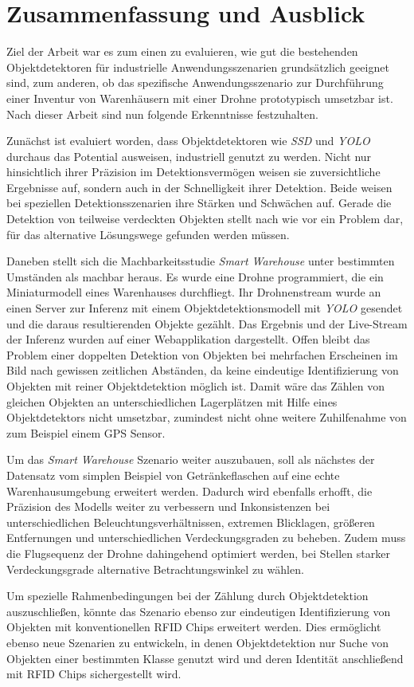 \chapter{Zusammenfassung und Ausblick}

Ziel der Arbeit war es zum einen zu evaluieren, wie gut die bestehenden Objektdetektoren für industrielle Anwendungsszenarien grundsätzlich geeignet sind, zum anderen, ob das spezifische Anwendungsszenario zur Durchführung einer Inventur von Warenhäusern mit einer Drohne prototypisch umsetzbar ist. Nach dieser Arbeit sind nun folgende Erkenntnisse festzuhalten.

Zunächst ist evaluiert worden, dass Objektdetektoren wie \textit{SSD} und \textit{YOLO} durchaus das Potential ausweisen, industriell genutzt zu werden. Nicht nur hinsichtlich ihrer Präzision im Detektionsvermögen weisen sie zuversichtliche Ergebnisse auf, sondern auch in der Schnelligkeit ihrer Detektion. Beide weisen bei speziellen Detektionsszenarien ihre Stärken und Schwächen auf. Gerade die Detektion von teilweise verdeckten Objekten stellt nach wie vor ein Problem dar, für das alternative Lösungswege gefunden werden müssen. 

Daneben stellt sich die Machbarkeitsstudie \textit{Smart Warehouse} unter bestimmten Umständen als machbar heraus. Es wurde eine Drohne programmiert, die ein Miniaturmodell eines Warenhauses durchfliegt. Ihr Drohnenstream wurde an einen Server zur Inferenz mit einem Objektdetektionsmodell mit \textit{YOLO} gesendet und die daraus resultierenden Objekte gezählt. Das Ergebnis und der Live-Stream der Inferenz wurden auf einer Webapplikation dargestellt. Offen bleibt das Problem einer doppelten Detektion von Objekten bei mehrfachen Erscheinen im Bild nach gewissen zeitlichen Abständen, da keine eindeutige Identifizierung von Objekten mit reiner Objektdetektion möglich ist. Damit wäre das Zählen von gleichen Objekten an unterschiedlichen Lagerplätzen mit Hilfe eines Objektdetektors nicht umsetzbar, zumindest nicht ohne weitere Zuhilfenahme von zum Beispiel einem GPS Sensor.

Um das \textit{Smart Warehouse} Szenario weiter auszubauen, soll als nächstes der Datensatz vom simplen Beispiel von Getränkeflaschen auf eine echte Warenhausumgebung erweitert werden. Dadurch wird ebenfalls erhofft, die Präzision des Modells weiter zu verbessern und Inkonsistenzen bei unterschiedlichen Beleuchtungsverhältnissen, extremen Blicklagen, größeren Entfernungen und unterschiedlichen Verdeckungsgraden zu beheben. Zudem muss die Flugsequenz der Drohne dahingehend optimiert werden, bei Stellen starker Verdeckungsgrade alternative Betrachtungswinkel zu wählen. 

Um spezielle Rahmenbedingungen bei der Zählung durch Objektdetektion auszuschließen, könnte das Szenario ebenso zur eindeutigen Identifizierung von Objekten mit konventionellen RFID Chips erweitert werden. Dies ermöglicht ebenso neue Szenarien zu entwickeln, in denen Objektdetektion nur Suche von Objekten einer bestimmten Klasse genutzt wird und deren Identität anschließend mit RFID Chips sichergestellt wird. 